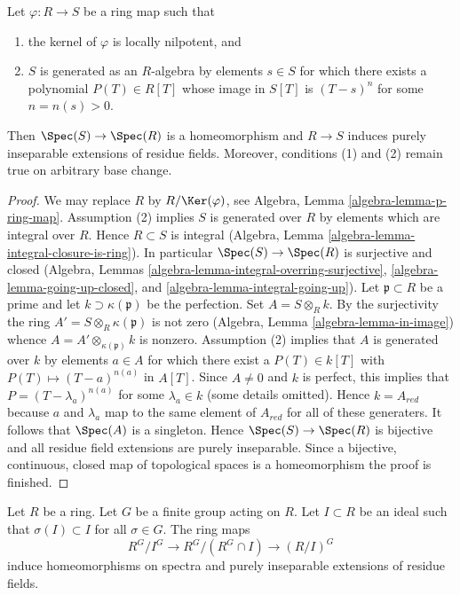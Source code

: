 \begin{lemma}
\label{lemma-universally-bijective}
Let $\varphi : R \to S$ be a ring map such that
\begin{enumerate}
\item the kernel of $\varphi$ is locally nilpotent, and
\item $S$ is generated as an $R$-algebra by elements $s \in S$
for which there exists a polynomial $P(T) \in R[T]$
whose image in $S[T]$ is $(T - s)^n$ for some $n = n(s) > 0$.
\end{enumerate}
Then $\Spec(S) \to \Spec(R)$ is a homeomorphism and $R \to S$
induces purely inseparable extensions of residue fields.
Moreover, conditions (1) and (2) remain true on arbitrary base change.
\end{lemma}

\begin{proof}
We may replace $R$ by $R/\Ker(\varphi)$, see
Algebra, Lemma \ref{algebra-lemma-p-ring-map}.
Assumption (2) implies $S$ is generated over $R$ by
elements which are integral over $R$.
Hence $R \subset S$ is integral
(Algebra, Lemma \ref{algebra-lemma-integral-closure-is-ring}).
In particular $\Spec(S) \to \Spec(R)$ is surjective and closed
(Algebra, Lemmas \ref{algebra-lemma-integral-overring-surjective},
\ref{algebra-lemma-going-up-closed}, and
\ref{algebra-lemma-integral-going-up}).
Let $\mathfrak p \subset R$ be a prime and let
$k \supset \kappa(\mathfrak p)$ be the perfection.
Set $A = S \otimes_R k$. By the surjectivity
the ring $A' = S \otimes_R \kappa(\mathfrak p)$ is not zero
(Algebra, Lemma \ref{algebra-lemma-in-image})
whence $A = A' \otimes_{\kappa(\mathfrak p)} k$ is nonzero.
Assumption (2) implies that $A$ is generated over $k$ by elements
$a \in A$ for which there exist a $P(T) \in k[T]$ with
$P(T) \mapsto (T - a)^{n(a)}$ in $A[T]$. Since $A \not = 0$ and
$k$ is perfect, this implies that $P = (T - \lambda_a)^{n(a)}$
for some $\lambda_a \in k$ (some details omitted).
Hence $k = A_{red}$ because $a$ and $\lambda_a$
map to the same element of $A_{red}$ for all of these generaters.
It follows that $\Spec(A)$ is a singleton.
Hence $\Spec(S) \to \Spec(R)$ is bijective and all residue field extensions
are purely inseparable. Since a bijective, continuous, closed map
of topological spaces is a homeomorphism the proof is finished.
\end{proof}

\begin{lemma}
\label{lemma-invariants-modulo}
Let $R$ be a ring. Let $G$ be a finite group acting on $R$. Let $I \subset R$
be an ideal such that $\sigma(I) \subset I$ for all $\sigma \in G$.
The ring maps
$$
R^G/I^G \longrightarrow R^G/(R^G \cap I) \longrightarrow (R/I)^G
$$
induce homeomorphisms on spectra and purely inseparable extensions of
residue fields.
\end{lemma}


